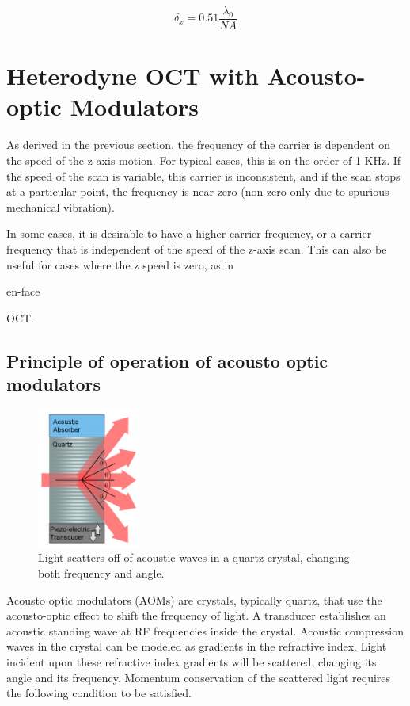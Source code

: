\begin{equation} \label{eq:tres}
\delta_x = 0.51 \frac{\lambda_0}{NA}
\end{equation}

\section{Heterodyne OCT with Acousto-optic Modulators}

As derived in the previous section, the frequency of the carrier is dependent on the speed of the z-axis motion. For typical cases, this is on the order of 1 KHz. If the speed of the scan is variable, this carrier is inconsistent, and if the scan stops at a particular point, the frequency is near zero (non-zero only due to spurious mechanical vibration).

In some cases, it is desirable to have a higher carrier frequency, or a carrier frequency that is independent of the speed of the z-axis scan. This can also be useful for cases where the z speed is zero, as in \begin{em}en-face\end{em} OCT. \cite{bouma} \cite{hitzenberger}

\subsection{Principle of operation of acousto optic modulators}

\begin{figure}[h!]
\centering
\includegraphics[width=0.3\textwidth]{Images/Background/aom.png}
\caption{Light scatters off of acoustic waves in a quartz crystal, changing both frequency and angle.}
\end{figure}

Acousto optic modulators (AOMs) are crystals, typically quartz, that use the acousto-optic effect to shift the frequency of light. A transducer establishes an acoustic standing wave at RF frequencies inside the crystal. Acoustic compression waves in the crystal can be modeled as gradients in the refractive index. Light incident upon these refractive index gradients will be scattered, changing its angle and its frequency. Momentum conservation of the scattered light requires the following condition to be satisfied. \cite{haus}

